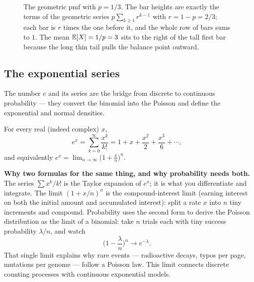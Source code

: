 \begin{figure}[H]
\centering
{}
\caption{The geometric pmf with $p=1/3$. The bar heights are exactly the terms
of the geometric series $p\sum_{k\ge 1} r^{k-1}$ with $r=1-p=2/3$; each bar is
$r$ times the one before it, and the whole row of bars sums to $1$. The mean
$\operatorname{\mathbb{E}}[X]=1/p=3$ sits to the right of the tall first bar because the long thin
tail pulls the balance point outward.}
\label{ch39:geompmf}
\end{figure}

\subsection{The exponential series}

The number $e$ and its series are the bridge from discrete to continuous
probability --- they convert the binomial into the Poisson and define the
exponential and normal densities.

\begin{proposition}
\label{ch39:exp}
For every real (indeed complex) $x$,
\[
  e^{x} = \sum_{k=0}^{\infty} \frac{x^{k}}{k!}
  = 1 + x + \frac{x^2}{2} + \frac{x^3}{6} + \cdots,
\]
and equivalently $\displaystyle e^{x} = \lim_{n\to\infty}\Big(1 +
\frac{x}{n}\Big)^{n}$.
\end{proposition}

\begin{happeningbox}
\textbf{Why two formulas for the same thing, and why probability needs both.}
The series $\sum x^k/k!$ is the Taylor expansion of $e^x$; it is what you
differentiate and integrate. The limit $(1+x/n)^n$ is the
compound-interest limit (earning interest on both the initial amount and accumulated interest): split a rate $x$ into $n$ tiny increments
and compound. Probability uses the second form to derive the Poisson
distribution as the limit of a binomial: take $n$ trials each with tiny
success probability $\lambda/n$, and watch
\[
  \Big(1 - \frac{\lambda}{n}\Big)^{n} \longrightarrow e^{-\lambda}.
\]
That single limit explains why rare events --- radioactive decays, typos
per page, mutations per genome --- follow a Poisson law. This limit connects
discrete counting processes with continuous exponential models.
\end{happeningbox}

